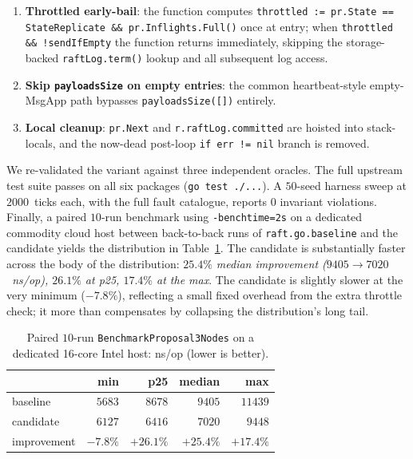 \documentclass{article}
\begin{document}
\begin{enumerate}
  \item \textbf{Throttled early-bail}: the function computes
    \texttt{throttled := pr.State == StateReplicate \&\&
    pr.Inflights.Full()} once at entry; when
    \texttt{throttled \&\& !sendIfEmpty} the function returns
    immediately, skipping the storage-backed
    \texttt{raftLog.term()} lookup and all subsequent log access.
  \item \textbf{Skip \texttt{payloadsSize} on empty entries}: the
    common heartbeat-style empty-MsgApp path bypasses
    \texttt{payloadsSize([])} entirely.
  \item \textbf{Local cleanup}: \texttt{pr.Next} and
    \texttt{r.raftLog.committed} are hoisted into stack-locals, and
    the now-dead post-loop \texttt{if err != nil} branch is
    removed.
\end{enumerate}

We re-validated the variant against three independent oracles. The
full upstream test suite passes on all six packages
(\texttt{go test ./...}). A $50$-seed harness sweep at $2000$~ticks
each, with the full fault catalogue, reports $0$ invariant
violations. Finally, a paired $10$-run benchmark using
\texttt{-benchtime=2s} on a dedicated commodity cloud host between
back-to-back runs of \texttt{raft.go.baseline} and the candidate
yields the distribution in Table~\ref{tab:bench-paired}. The
candidate is substantially faster across the body of the
distribution: \emph{$25.4\%$ median improvement
($9405 \rightarrow 7020$~ns/op), $26.1\%$ at p25, $17.4\%$ at the
max}. The candidate is slightly slower at the very minimum
($-7.8\%$), reflecting a small fixed overhead from the extra
throttle check; it more than compensates by collapsing the
distribution's long tail.

\begin{table}
  \caption{Paired $10$-run \texttt{BenchmarkProposal3Nodes} on a
    dedicated 16-core Intel host: ns/op (lower is better).}
  \label{tab:bench-paired}
  \centering
  \begin{tabular}{lrrrr}
    \toprule
    & min & p25 & median & max \\
    \midrule
    baseline   & $5683$ & $8678$ & $9405$ & $11439$ \\
    candidate  & $6127$ & $6416$ & $7020$ & $9448$ \\
    \midrule
    improvement & $-7.8\%$ & $+26.1\%$ & $+25.4\%$ & $+17.4\%$ \\
    \bottomrule
  \end{tabular}
\end{table}
\end{document}
